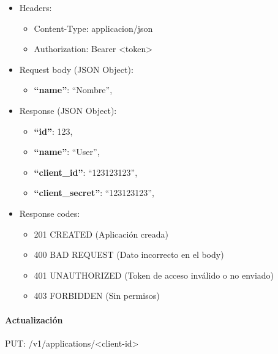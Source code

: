\documentclass[12pt,a4paperpaper,]{report}
\providecommand{\tightlist}{%
  \setlength{\itemsep}{0pt}\setlength{\parskip}{0pt}}
\let\oldparagraph\paragraph
\renewcommand{\paragraph}[1]{\oldparagraph{#1}\mbox{}}
\begin{document}
\begin{itemize}
\tightlist
\item
  Headers:

  \begin{itemize}
  \tightlist
  \item
    Content-Type: applicacion/json
  \item
    Authorization: Bearer \textless{}token\textgreater{}
  \end{itemize}
\item
  Request body (JSON Object):

  \begin{itemize}
  \tightlist
  \item
    \textbf{``name''}: ``Nombre'',
  \end{itemize}
\item
  Response (JSON Object):

  \begin{itemize}
  \tightlist
  \item
    \textbf{``id''}: 123,
  \item
    \textbf{``name''}: ``User'',
  \item
    \textbf{``client\_id''}: ``123123123'',
  \item
    \textbf{``client\_secret''}: ``123123123'',
  \end{itemize}
\item
  Response codes:

  \begin{itemize}
  \tightlist
  \item
    201 CREATED (Aplicación creada)
  \item
    400 BAD REQUEST (Dato incorrecto en el body)
  \item
    401 UNAUTHORIZED (Token de acceso inválido o no enviado)
  \item
    403 FORBIDDEN (Sin permisos)
  \end{itemize}
\end{itemize}

\paragraph{Actualización}\label{actualizaciuxf3n-2}

PUT: /v1/applications/\textless{}client-id\textgreater{}
\end{document}
